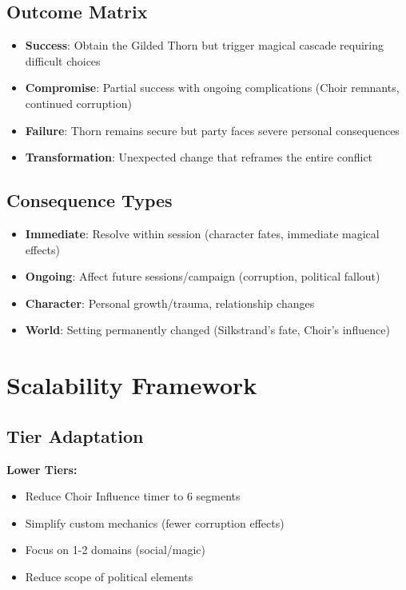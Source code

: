 \documentclass[11pt]{article}
\begin{document}
\subsection*{Outcome Matrix}

\begin{itemize}
  \item \textbf{Success}: Obtain the Gilded Thorn but trigger magical cascade requiring difficult choices
  \item \textbf{Compromise}: Partial success with ongoing complications (Choir remnants, continued corruption)
  \item \textbf{Failure}: Thorn remains secure but party faces severe personal consequences
  \item \textbf{Transformation}: Unexpected change that reframes the entire conflict
\end{itemize}

\subsection*{Consequence Types}

\begin{itemize}
  \item \textbf{Immediate}: Resolve within session (character fates, immediate magical effects)
  \item \textbf{Ongoing}: Affect future sessions/campaign (corruption, political fallout)
  \item \textbf{Character}: Personal growth/trauma, relationship changes
  \item \textbf{World}: Setting permanently changed (Silkstrand's fate, Choir's influence)
\end{itemize}

\section*{Scalability Framework}

\subsection*{Tier Adaptation}

\textbf{Lower Tiers:}
\begin{itemize}
  \item Reduce Choir Influence timer to 6 segments
  \item Simplify custom mechanics (fewer corruption effects)
  \item Focus on 1-2 domains (social/magic)
  \item Reduce scope of political elements
\end{itemize}
\end{document}
